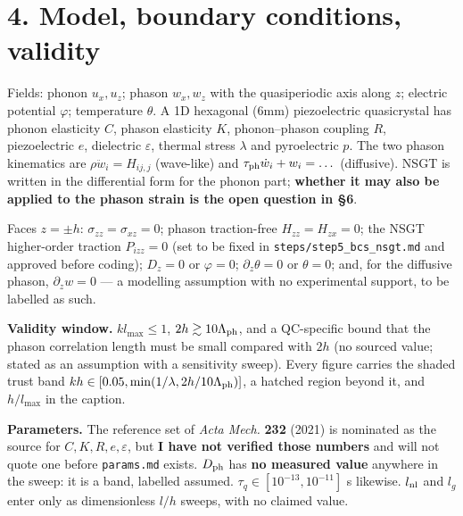 \documentclass[11pt]{article}
\begin{document}
\section*{4. Model, boundary conditions, validity}
Fields: phonon $u_x,u_z$; phason $w_x,w_z$ with the quasiperiodic axis along $z$; electric potential
$\varphi$; temperature $\theta$. A 1D hexagonal (6mm) piezoelectric quasicrystal has phonon
elasticity $C$, phason elasticity $K$, phonon--phason coupling $R$, piezoelectric $e$, dielectric
$\varepsilon$, thermal stress $\lambda$ and pyroelectric $p$. The two phason kinematics are
$\rho\ddot w_i=H_{ij,j}$ (wave-like) and $\tau_{\rm ph}\dot w_i+w_i=\dots$ (diffusive). NSGT is
written in the differential form for the phonon part; \textbf{whether it may also be applied to the
phason strain is the open question in \S6}.

Faces $z=\pm h$: $\sigma_{zz}=\sigma_{xz}=0$; phason traction-free $H_{zz}=H_{zx}=0$; the NSGT
higher-order traction $P_{izz}=0$ (set to be fixed in \texttt{steps/step5\_bcs\_nsgt.md} and
approved before coding); $D_z=0$ or $\varphi=0$; $\partial_z\theta=0$ or $\theta=0$; and, for the
diffusive phason, $\partial_z w=0$ --- a modelling assumption with no experimental support, to be
labelled as such.

\textbf{Validity window.} $kl_{\max}\le1$, $2h\gtrsim10\Lambda_{\rm ph}$, and a QC-specific bound
that the phason correlation length must be small compared with $2h$ (no sourced value; stated as an
assumption with a sensitivity sweep). Every figure carries the shaded trust band
$kh\in[0.05,\min(1/\lambda,2h/10\Lambda_{\rm ph})]$, a hatched region beyond it, and $h/l_{\max}$ in
the caption.

\textbf{Parameters.} The reference set of \emph{Acta Mech.} \textbf{232} (2021) is nominated as the
source for $C,K,R,e,\varepsilon$, but \textbf{I have not verified those numbers} and will not quote
one before \texttt{params.md} exists. $D_{\rm ph}$ has \textbf{no measured value} anywhere in the
sweep: it is a band, labelled assumed. $\tau_q\in[10^{-13},10^{-11}]$ s likewise. $l_{\rm nl}$ and
$l_g$ enter only as dimensionless $l/h$ sweeps, with no claimed value.
\end{document}
